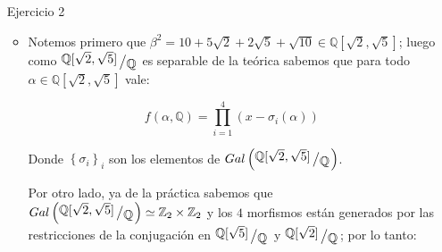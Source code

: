 \documentclass[11pt]{article}
\newcommand{\Q}{\mathbb{Q}}
\newcommand{\Z}{\mathbb{Z}}
\newcommand{\sett}[1]{\left\lbrace#1\right\rbrace}
\newcommand{\quotient}[2]{{\raisebox{.2em}{$#1$}\left/\raisebox{-.2em}{$#2$}\right.}}
\numberwithin{theorem}{subsection}
\newcommand{\qed}{\nobreak \ifvmode \relax \else
	\ifdim\lastskip<1.5em \hskip-\lastskip
	\hskip1.5em plus0em minus0.5em \fi \nobreak
	\vrule height0.75em width0.5em depth0.25em\fi}
\begin{document}
\begin{enumerate}
\begin{itemize}
	\begin{equation*}
		\begin{aligned}
			\dfrac{\left(t^{37^2} - t\right)^{38}}{\left(t^{37} - t\right)^{37^2 + 1}} = & \dfrac{t^{q+1}\left(t^{q^2 -1} - 1\right)^{q+1}}{t^{q^2 + 1}\left(t^{q-1} - 1\right)^{q^2 + 1}} \\
			= & \dfrac{\left( \left(t^{q -1} \right)^{q+1} - 1\right)^{q+1}}{t^{q^2 - q} \left(t^{q-1} - 1\right)^{q^2 + 1}} \\
			= & \dfrac{\left( \left(t^{q -1} \right) - 1\right)^{q+1} \left(\sum\limits_{r=0}^{q}{t^{(q-1)r}}\right)^{q+1}}{t^{q^2 - q} \left(t^{q-1} - 1\right)^{q^2 + 1}}  \\
			= & \dfrac{\left(\sum\limits_{r=0}^{q}{t^{(q-1)r}}\right)^{q+1}}{t^{q^2 - q} \left(t^{q-1} - 1\right)^{q^2 -q}}  \\
			= & \frac{g}{h} \qquad \text{pues } (g,h) = 1
		\end{aligned}
	\end{equation*}
	
	Y finalmente $\max \left\lbrace gr(g), gr(h) \right\rbrace = \max \sett{\underbrace{q^2 - q + \left(q-1\right)\left(q^2 - q\right)}_{q^3 - q^2}, \underbrace{(q-1)q(q+1)}_{q^3 - q}} = q^3 - q$, luego conlcuimos que $E^G = \mathbb{F}_{37}(f)$. \qed
	
	\end{itemize}
	
	\item[Ejercicio 2] 
	
	\begin{itemize}
		\item Notemos primero que $\beta^2 = 10 + 5\sqrt{2} + 2\sqrt{5} + \sqrt{10} \in \Q[\sqrt{2}, \sqrt{5 }]$; luego como $\quotient{\Q[\sqrt{2}, \sqrt{5 }]}{\Q}$ es separable de la te\'orica sabemos que para todo $\alpha \in \Q[\sqrt{2}, \sqrt{5 }]$ vale:
		
		\begin{equation*}
			f \left(\alpha, \Q\right) = \prod\limits_{i=1}^{4} \left(x - \sigma_i(\alpha)\right)
		\end{equation*}
		
		Donde $\sett{\sigma_i}_i$ son los elementos de $Gal \left(\quotient{\Q[\sqrt{2}, \sqrt{5 }]}{\Q}\right)$.
		
		Por otro lado, ya de la pr\'actica sabemos que $Gal \left(\quotient{\Q[\sqrt{2}, \sqrt{5 }]}{\Q}\right) \simeq \Z_2 \times \Z_2$ y los $4$ morfismos est\'an generados por las restricciones de la conjugaci\'on en $\quotient{\Q[\sqrt{5 }]}{\Q}$ y $\quotient{\Q[\sqrt{2}]}{\Q}$; por lo tanto:
		

\end{itemize}
\end{enumerate}
\end{document}
